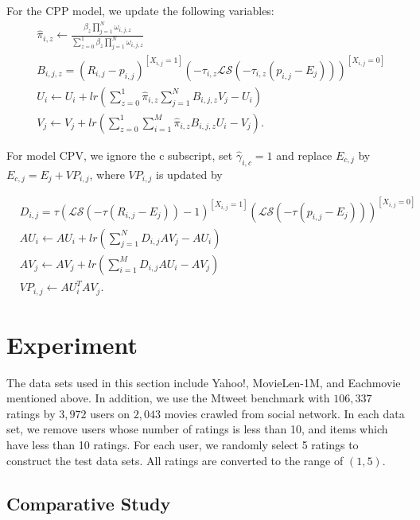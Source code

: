 \documentclass[sigconf]{acmart}
\begin{document}
For the CPP model, we update the following variables:
\begin{equation}
\begin{split}
&\hat{\pi}_{i,z}\leftarrow\frac{\beta_z\prod_{j=1}^{N}\omega_{i,j,z}}{\sum_{z=0}^{1}\beta_z\prod_{j=1}^{N}\omega_{i,j,z}} \\
&B_{i,j,z}=(R_{i,j}-p_{i,j})^{[X_{i,j}=1]}(-\tau_{i,z}\mathcal{LS}(-\tau_{i,z}(p_{i,j}-E_{j})))^{[X_{i,j}=0]} \\
&U_{i}\leftarrow U_{i}+lr(\sum\limits_{z=0}^{1}\hat{\pi}_{i,z}\sum\limits_{j=1}^{N}B_{i,j,z}V_j-U_{i}) \\
&V_j\leftarrow V_j+lr(\sum\limits_{z=0}^{1}\sum\limits_{i=1}^{M}\hat{\pi}_{i,z}B_{i,j,z}U_{i}-V_j).
\end{split}
\end{equation}

For  model CPV,  we ignore the c subscript, set $\hat{\gamma}_{i,c}=1$ and replace $E_{c,j}$ by $E_{c,j}=E_{j}+VP_{i,j}$, where $VP_{i,j}$ is updated by

\begin{equation}
\begin{split}
&D_{i,j}=\tau(\mathcal{LS}(-\tau(R_{i,j}-E_{j}))-1)^{[X_{i,j}=1]}(\mathcal{LS}(-\tau(p_{i,j}-E_{j})))^{[X_{i,j}=0]} \\
&AU_{i}\leftarrow AU_{i}+lr(\sum\limits_{j=1}^{N}D_{i,j}AV_j-AU_{i}) \\
&AV_{j}\leftarrow AV_{j}+lr(\sum\limits_{i=1}^{M}D_{i,j}AU_{i}-AV_j) \\
&VP_{i,j} \leftarrow AU_{i}^{T}AV_{j}.
\end{split}
\end{equation}

\section{Experiment}\label{sec:experiment}

The data sets used in this section include Yahoo!, MovieLen-1M, and Eachmovie mentioned above. In addition, we use the Mtweet benchmark with $106,337$ ratings by $3,972$ users on $2,043$ movies crawled from social network. In each data set, we remove users whose number of ratings is less than 10, and items which have less than 10 ratings. For each user, we randomly select 5 ratings to construct the test data sets. All ratings are converted to the range of $(1,5)$.


\subsection{Comparative Study}\label{sec:ndcg}
\end{document}
